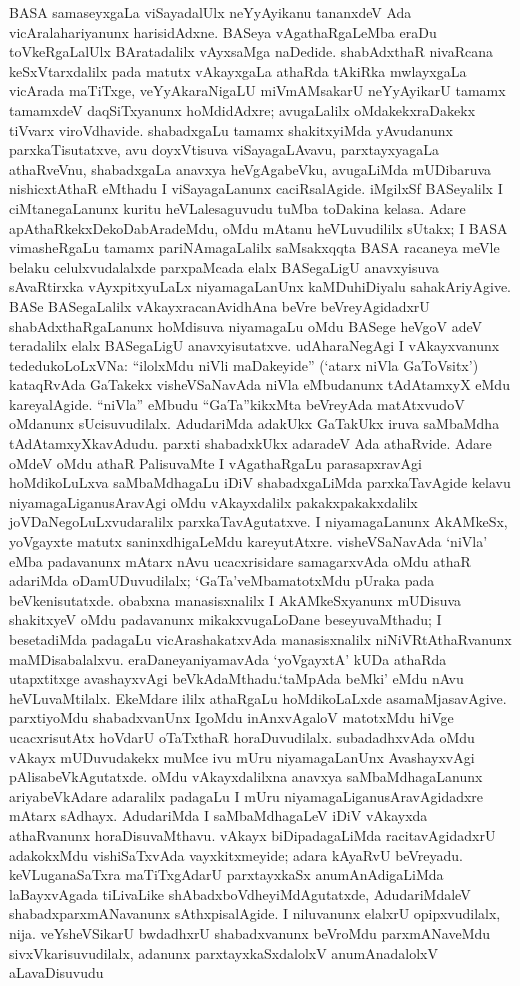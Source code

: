BASA samaseyxgaLa viSayadalUlx neYyAyikanu tananxdeV Ada vicAralahariyanunx harisidAdxne. BASeya vAgathaRgaLeMba eraDu toVkeRgaLalUlx BAratadalilx vAyxsaMga naDedide. shabAdxthaR nivaRcana keSxVtarxdalilx pada matutx vAkayxgaLa athaRda tAkiRka mwlayxgaLa vicArada maTiTxge, veYyAkaraNigaLU miVmAMsakarU neYyAyikarU tamamx tamamxdeV daqSiTxyanunx hoMdidAdxre; avugaLalilx oMdakekxraDakekx tiVvarx viroVdhavide. shabadxgaLu tamamx shakitxyiMda yAvudanunx parxkaTisutatxve, avu doyxVtisuva viSayagaLAvavu, parxtayxya\-gaLa athaRveVnu, shabadxgaLa anavxya heVgAgabeVku, avugaLiMda mUDibaruva nishicx\-tAthaR eMthadu I viSayagaLanunx caciRsalAgide. iMgilxSf BASeyalilx I ciMtane\-gaLanunx kuritu heVLalesaguvudu tuMba toDakina kelasa. Adare apAthaRkekxDekoDabAradeMdu, oMdu mAtanu heVLuvudililx sUtakx; I BASA vimasheRgaLu tamamx pariNAmagaLalilx saMsakxqqta BASA racaneya meVle belaku celulxvudalalxde parxpaMcada elalx BASegaLigU anavxyisuva sAvaRtirxka vAyxpitxyuLaLx niyamagaLanUnx kaMDuhiDiyalu sahakAri\-yAgive. BASe BASegaLalilx vAkayxracanAvidhAna beVre beVreyAgidadxrU shabAdxthaRgaLanunx hoMdi\-suva niyamagaLu oMdu BASege heVgoV adeV teradalilx elalx BASegaLigU anavxyi\-sutatxve. udAharaNegAgi I vAkayxvanunx tededukoLoLxVNa: ``ilolxMdu niVli maDake\-yide'' (`atarx niVla GaToVsitx') kataqRvAda GaTakekx visheVSaNavAda niVla eMbu\-danunx tAdAtamxyX eMdu kareyalAgide. ``niVla'' eMbudu ``GaTa''kikxMta beVreyAda matAtx\-vudoV oMdanunx sUcisuvudilalx. AdudariMda adakUkx GaTakUkx iruva saMbaMdha tAdAtamxyXkavAdudu. parxti shabadxkUkx adaradeV Ada athaRvide. Adare oMdeV oMdu athaR PalisuvaMte I vAgathaRgaLu parasapxravAgi hoMdikoLuLxva saMbaMdhagaLu iDiV shabadxgaLiMda parxkaTavAgide kelavu niyamagaLiganusAravAgi oMdu vAkayxdalilx pakakxpakakx\-dalilx joVDaNegoLuLxvudaralilx parxkaTavAgutatxve. I niyamagaLanunx AkAMkeSx, yoVgayxte matutx saninxdhigaLeMdu kareyutAtxre. visheVSaNavAda `niVla' eMba padavanunx mAtarx nAvu ucacxrisidare samagarxvAda oMdu athaR adariMda oDamUDuvudilalx; `GaTa'veMba\break \hbox{matotxMdu} pUraka pada beVkenisutatxde. obabxna manasisxnalilx I AkAMkeSxyanunx mUDi\-suva shakitxyeV oMdu padavanunx mikakxvugaLoDane beseyuvaMthadu; I besetadiMda padagaLu vicArashakatxvAda manasisxnalilx niNiVRtAthaRvanunx maMDisabalalxvu. eraDaneya\break niyamavAda `yoVgayxtA' kUDa athaRda utapxtitxge avashayxvAgi beVkAdaMthadu.\break `taMpAda beMki' eMdu nAvu heVLuvaMtilalx. EkeMdare ililx athaRgaLu hoMdikoLaLxde asamaMjasavAgive. parxtiyoMdu shabadxvanUnx IgoMdu inAnxvAgaloV matotxMdu hiVge ucacxrisutAtx hoVdarU oTaTxthaR horaDuvudilalx. subadadhxvAda oMdu vAkayx mUDuvudakekx muMce ivu mUru niyamagaLanUnx AvashayxvAgi pAlisabeVkAgutatxde. oMdu vAkayxdalilxna anavxya saMbaMdhagaLanunx ariyabeVkAdare adaralilx padagaLu I mUru niyamagaLiganusAravAgidadxre mAtarx sAdhayx. AdudariMda I saMbaMdhagaLeV iDiV vAkayxda athaRvanunx horaDisuvaMthavu. vAkayx biDipadagaLiMda racitavAgidadxrU adakokxMdu vishiSaTxvAda vayxkitxmeyide; adara kAyaRvU beVreyadu. keVLuganaSaTxra maTiTxgAdarU parxtayxkaSx anumAnAdigaLiMda laBayxvAgada tiLivaLike shAbadxboVdheyiMdA\-gutatxde, AdudariMdaleV shabadxparxmANavanunx sAthxpisalAgide. I niluvanunx elalxrU opipx\-vudilalx, nija. veYsheVSikarU bwdadhxrU shabadxvanunx beVroMdu parxmANaveMdu sivxVkarisu\-vudilalx, adanunx parxtayxkaSxdalolxV anumAnadalolxV aLavaDisuvudu 